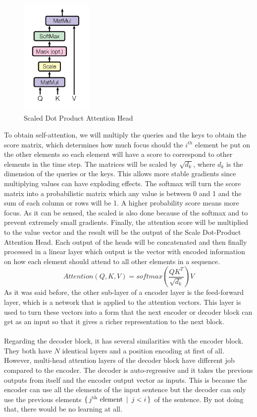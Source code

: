 \documentclass[../main.tex]{subfiles}
\begin{document}
\begin{figure}[H]
	\centering
	\includegraphics[width=3.5cm]{imgs/relatedwork/transformer-scale-dot-product-attention}
	\caption{Scaled Dot Product Attention Head}
	\label{fig:related-transformer-head}
\end{figure}
To obtain self-attention, we will multiply the queries and the keys to obtain the score matrix, which determines how much focus should the $i^{th}$ element be put on the other elements so each element will have a score to correspond to other elements in the time step. The matrices will be scaled by $\sqrt{d_k}$, where $d_k$ is the dimension of the queries or the keys. This allows more stable gradients since multiplying values can have exploding effects. The softmax will turn the score matrix into a probabilistic matrix which any value is between 0 and 1 and the sum of each column or rows will be 1. A higher probability score means more focus. As it can be sensed, the scaled is also done because of the softmax and to prevent extremely small gradients. Finally, the attention score will be multiplied to the value vector and the result will be the output of the Scale Dot-Product Attention Head. Each output of the heads will be concatenated and then finally processed in a linear layer which output is the vector with encoded information on how each element should attend to all other elements in a sequence.
\[Attention(Q, K, V) = softmax(\frac{QK^T}{\sqrt{d_k}}) V\]
As it was said before, the other sub-layer of a encoder layer is the feed-forward layer, which is a network that is applied to the attention vectors. This layer is used to turn these vectors into a form that the next encoder or decoder block can get as an input so that it gives a richer representation to the next block.
\\
\\
Regarding the decoder block, it has several similarities with the encoder block. They both have $N$ identical layers and a position encoding at first of all. However, multi-head attention layers of the decoder block have different job compared to the encoder. The decoder is auto-regressive and it takes the previous outputs from itself and the encoder output vector as inputs. This is because the encoder can use all the elements of the input sentence  but the decoder can only use the previous elements $\{ \, j\text{\textsuperscript{th} element} \, \, \, | \, \, \, j < i \, \}$ of the sentence. By not doing that, there would be no learning at all.
\end{document}
